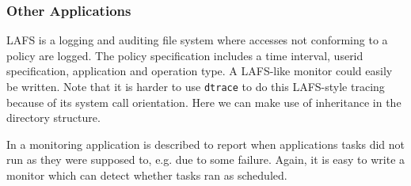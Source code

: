 \subsubsection{Other Applications}

LAFS \cite{lafs}
is a logging and auditing file system where accesses not conforming
to a policy are logged.
The policy specification
includes a time interval, userid specification, application
and operation type. A LAFS-like monitor could easily be written.
Note that it is harder to use {\tt dtrace} to do this LAFS-style tracing 
because of its system call orientation. Here we can make use of 
inheritance in the directory structure. 

In \cite{finke} a monitoring application is described to report when 
applications tasks did not run as they were supposed to, e.g. due to some
failure. Again, it is easy to write a monitor which can detect whether
tasks ran as scheduled.

